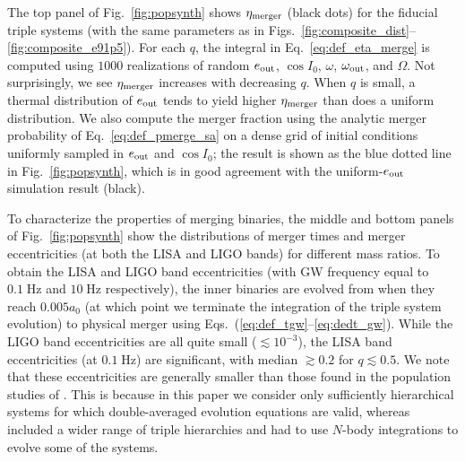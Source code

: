 \documentclass[
        fleqn,
        usenatbib,
    ]{mnras}
\begin{document}
The top panel of Fig.~\ref{fig:popsynth} shows $\eta_{\rm merger}$ (black
dots) for the fiducial triple systems (with the same parameters as in
Figs.~\ref{fig:composite_dist}--\ref{fig:composite_e91p5}). For each $q$, the
integral in Eq.~\eqref{eq:def_eta_merge} is computed using $1000$ realizations
of random $e_{\rm out}$, $\cos I_0$, $\omega$, $\omega_{\rm out}$, and
$\Omega$. Not surprisingly, we see $\eta_{\rm merger}$ increases with decreasing
$q$. When $q$ is small, a thermal distribution of $e_{\rm out}$ tends to yield
higher $\eta_{\rm merger}$ than does a uniform distribution. We also compute the
merger fraction using the analytic merger probability of
Eq.~\eqref{eq:def_pmerge_sa} on a dense grid of initial conditions uniformly
sampled in $e_{\rm out}$ and $\cos I_0$; the result is shown as the blue dotted
line in Fig.~\ref{fig:popsynth}, which is in good agreement with the
uniform-$e_{\rm out}$ simulation result (black).

To characterize the properties of merging binaries, the middle and bottom panels
of Fig.~\ref{fig:popsynth} show the distributions of merger times and merger
eccentricities (at both the LISA and LIGO bands) for different mass ratios. To
obtain the LISA and LIGO band eccentricities (with GW frequency equal to
$0.1\;\mathrm{Hz}$ and $10\;\mathrm{Hz}$ respectively), the inner binaries are
evolved from when they reach $0.005 a_0$ (at which point we terminate the
integration of the triple system evolution) to physical merger using
Eqs.~(\ref{eq:def_tgw}--\ref{eq:dedt_gw}). While the LIGO band eccentricities
are all quite small ($\lesssim 10^{-3}$), the LISA band eccentricities (at $0.1
\;\mathrm{Hz}$) are significant, with median $\gtrsim 0.2$ for $q\lesssim 0.5$.
We note that these eccentricities are generally smaller than those found in the
population studies of \citet{LL19}. This is because in this paper we consider
only sufficiently hierarchical systems for which double-averaged evolution
equations are valid, whereas \citet{LL19} included a wider range of triple
hierarchies and had to use $N$-body integrations to evolve some of the systems.
\end{document}
